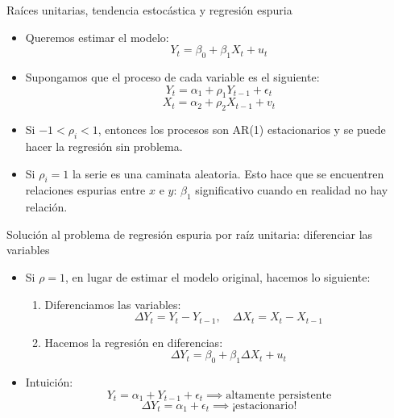 \documentclass{beamer}
\begin{document}
\begin{frame}{Raíces unitarias, tendencia estocástica y regresión espuria}
    \begin{itemize}
        \item Queremos estimar el modelo:
        \[
        Y_t = \beta_0 + \beta_1 X_t + u_t
        \]
        \item Supongamos que el proceso de cada variable es el siguiente:
        \[
        Y_t = \alpha_1 + \rho_1 Y_{t-1} + \epsilon_t
        \]
        \[
        X_t = \alpha_2 + \rho_2 X_{t-1} + v_t
        \]
        \item Si $-1 < \rho_i < 1$, entonces los procesos son AR(1) estacionarios y se puede hacer la regresión sin problema. 
        \item Si $\rho_i = 1$ la serie es una caminata aleatoria. 
     Esto hace que se encuentren relaciones espurias entre $x$ e $y$: $\beta_1$ significativo cuando en realidad no hay relación.
    \end{itemize}
\end{frame}
\begin{frame}{Solución al problema de regresión espuria por raíz unitaria: diferenciar las variables}
    \begin{itemize}
        \item Si $\rho = 1$, en lugar de estimar el modelo original, hacemos lo siguiente:
        \begin{enumerate}
            \item Diferenciamos las variables:
            \[
            \Delta Y_t = Y_t - Y_{t-1}, \quad \Delta X_t = X_t - X_{t-1}
            \]
            \item Hacemos la regresión en diferencias:
            \[
            \Delta Y_t = \beta_0 + \beta_1 \Delta X_t + u_t
            \]
        \end{enumerate}
        \item Intuición:
        \[
        Y_t = \alpha_1 + Y_{t-1} + \epsilon_t \implies \text{altamente persistente}
        \]
        \[
        \Delta Y_t = \alpha_1 + \epsilon_t \implies \text{¡estacionario!}
        \]
    \end{itemize}
\end{frame}
\end{document}
